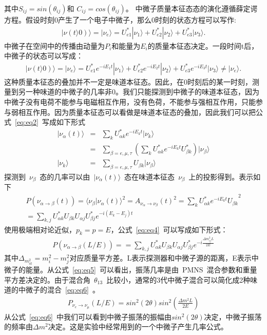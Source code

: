 其中$S_{ij} = sin (\theta_{ij}) $和 $C_{ij} = cos (\theta_{ij}) $。
中微子质量本征态态的演化遵循薛定谔方程。假设时刻0产生了一个电子中微子，那么0时刻的状态方程可以写作:
\begin{eqnarray}\label{eq:eq1}
|\nu(t\rangle0)\rangle = | \nu_e\rangle =U^*_{e1}|\nu_1\rangle+U^*_{e2}|\nu_2\rangle+U^*_{e3}|\nu_3\rangle .
\end{eqnarray}
中微子在空间中的传播由动量为$P_i$和能量为$E_i$的质量本征态决定。一段时间t后，中微子的状态可以写成：
\begin{eqnarray}\label{eq:eq2}
|\nu(t\rangle0)\rangle = | \nu_e\rangle =U^*_{e1}e^{-iE_1t}|\nu_1\rangle+U^*_{e2}e^{-iE_2t}|\nu_2\rangle+U^*_{e3}e^{-iE_3t}|\nu_3\rangle\neq |\nu_e\rangle .
\end{eqnarray}
这种质量本征态的叠加并不一定是味道本征态。因此，在0时刻后的某一时刻，测量到另一种味道的中微子的几率非0。我们只能探测到中微子的味道本征态，因为中微子没有电荷不能参与电磁相互作用，没有色荷，不能参与强相互作用，只能参与弱相互作用。因为质量本征态可以看做是味道本征态的叠加，因此我们可以把公式~\ref{eq:eq2}~写成如下形式
\begin{eqnarray}\label{eq:eq3}
 | \nu_{\alpha}(t)\rangle &=&\sum_k U^*_{\alpha k}e^{-iE_k t}|\nu_k\rangle \\
 &=& \sum_{\beta=e,\mu,\tau} \left ( \sum_k U^*_{\alpha k}e^{-iE_k t}U^*_{\beta k} \right )| \nu_{\beta}\rangle\\
| \nu_{k}\rangle &=& \sum_{\beta =e ,\mu,\tau}U_{\beta k}|\nu_{\beta} \rangle
\end{eqnarray}
探测到~$\nu_{\beta}$~态的几率可以由~$|\nu_{\alpha} (t) \rangle $~态在味道本征态~$\nu_{\beta}$~上的投影得到。表示如下
\begin{eqnarray}\label{eq:eq4}
P(\nu_{\alpha\rightarrow \beta }(t))={\langle \nu_{\beta}| \nu_{\alpha}(t)\rangle}^2={A_{\nu_{\alpha} \rightarrow \nu_{\beta}}(t)}^2={\sum_k U^*_{\alpha k}e^{-iE_k t}U_{\beta k}}^2 \\
=\sum_{k,j}U^*_{\alpha k}U_{\beta k}U_{\alpha j}U^*_{\beta j}e^{-i(E_k-E_j)t}
\end{eqnarray}
使用极端相对论近似，$p_k = p = E$，公式~\ref{eq:eq4}~可以写成如下形式：
\begin{eqnarray}\label{eq:eq5}
P(\nu_{\alpha\rightarrow \beta }(L/E))=
=\sum_{k,j}U^*_{\alpha k}U_{\beta k}U_{\alpha j}U^*_{\beta j}e^{-i\frac{\Delta{m_{ij}^2}L}{2E}}
\end{eqnarray}
其中$\Delta_{m_{ik}^2}=m_i^2-m_j^2$对应质量平方差。L表示探测器和中微子源的距离，E表示中微子的能量。从公式~\ref{eq:eq5}~可以看出，振荡几率是由~PMNS~混合参数和重量平方差决定的。由于混合角~$\theta_{13}$~比较小，通常的3代中微子混合可以简化成2种味道的中微子的混合~\ref{eq:eq6}~。
\begin{eqnarray}\label{eq:eq6}
P_{\nu_e  \rightarrow \nu_{\mu} } (L/E)=sin^2(2\theta)sin^2\left(\frac{\Delta m^2L}{2E}\right)
\end{eqnarray}
从公式~\ref{eq:eq6}~中我们可以看到中微子振荡的振幅由$sin^2(2\theta)$决定，中微子振荡的频率由$\Delta m^2 $决定。这是实验中经常用到的一个中微子产生几率公式。
